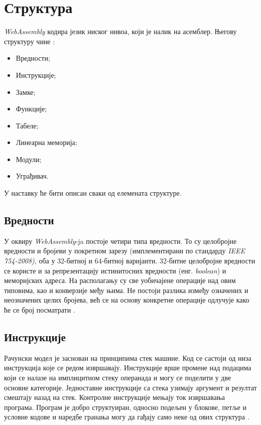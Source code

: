 \documentclass[12pt,oneside]{memoir}
\begin{document}
\section{Структура} \label{chp:STRUCT}

\textit{WebAssembly} кодира језик ниског нивоа, који је налик на асемблер. Његову структуру чине \cite{WASMS}:

\begin{itemize}
	\item Вредности;
	\item Инструкције;
	\item Замке;
	\item Функције;
	\item Табеле;
	\item Линеарна меморија;
	\item Модули;
	\item Уграђивач.
\end{itemize}
У наставку ће бити описан сваки од елемената структуре.

\subsection{Вредности}

У оквиру \textit{WebAssembly}-ja постоје четири типа вредности. То су целобројне вредности и бројеви у покретном
зарезу (имплементирани по стандарду \textit{IEEE 754-2008)}, оба у 32-битној и 64-битној варијанти. 32-битне
целобројне вредности се користе и за репрезентацију истинитосних вредности (енг. \textit{boolean}) и меморијских
адреса. На располагању су све уобичајене операције над овим типовима, као и конверзије међу њима. Не постоји разлика
између означених и неозначених целих бројева, већ се на основу конкретне операције одлучује како ће се број
посматрати \cite{WASMS}.

\subsection{Инструкције}

Рачунски модел је заснован на принципима стек машине. Код се састоји од низа инструкција које се редом извршавају.
Инструкције врше промене над подацима који се налазе на имплицитном стеку операнада и могу се поделити у две основне
категорије. Једноставне инструкције са стека узимају аргумент и резултат смештају назад на стек. Контролне
инструкције мењају ток извршавања програма. Програм је добро структуиран, односно подељен у блокове, петље и условне
кодове и наредбе гранања могу да гађају само неке од ових структура \cite{WASMS}.
\end{document}
